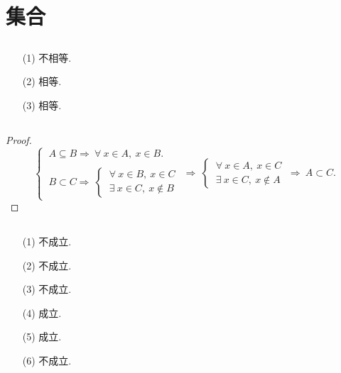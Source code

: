 \documentclass[UTF8]{ctexart}
\begin{document}
\fancyfoot[C]{\thepage}

\section{集合}
\subsection{}   %
\begin{enumerate}
    \item [(1)]不相等.
    \item [(2)]相等.
    \item [(3)]相等.
\end{enumerate}

\subsection{}   %
\begin{proof}
    \[
        \begin{cases}
            \ A \subseteq B \Rightarrow \ \forall\ x\in A,\ x\in B. \\
            \\
            \ B \subset C \Rightarrow
            \ 
            \begin{cases}
                \ \forall\ x\in B,\ x\in C \\
                \ \exists\ x\in C,\ x\notin B
            \end{cases}
        \end{cases}
        \Rightarrow\ 
        \begin{cases}
            \ \forall\ x\in A,\ x\in C\\
            \ \exists\ x\in C,\ x\notin A
        \end{cases}
        \ \Rightarrow\ 
        A \subset C.
    \]
\end{proof}

\subsection{}   %
\begin{enumerate}
    \item [(1)]不成立.
    \item [(2)]不成立.
    \item [(3)]不成立.
    \item [(4)]成立.
    \item [(5)]成立.
    \item [(6)]不成立.
\end{enumerate}
\end{document}
